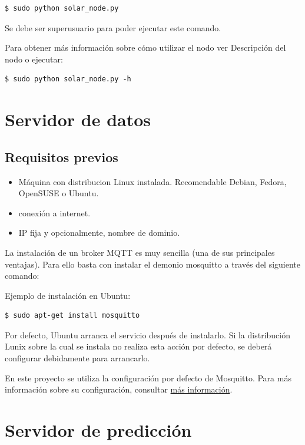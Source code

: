 \lstset{language=bash}
\begin{lstlisting}[frame=single]
$ sudo python solar_node.py
\end{lstlisting}

Se debe ser superusuario para poder ejecutar este comando.

Para obtener más información sobre cómo utilizar el nodo ver Descripción del nodo o ejecutar:

\lstset{language=bash}
\begin{lstlisting}[frame=single]
$ sudo python solar_node.py -h
\end{lstlisting}

\section{Servidor de datos}
\label{makereference7.2}
\subsection{Requisitos previos}
\label{makereference7.3}
\begin{itemize}
\item Máquina con distribucion Linux instalada. Recomendable Debian, Fedora, OpenSUSE o Ubuntu.
\item conexión a internet.
\item IP fija y opcionalmente, nombre de dominio.
\end{itemize}

La instalación de un broker MQTT es muy sencilla (una de sus principales ventajas). Para ello basta con instalar el demonio mosquitto a través del siguiente comando:

Ejemplo de instalación en Ubuntu:
\lstset{language=bash}
\begin{lstlisting}[frame=single]
$ sudo apt-get install mosquitto
\end{lstlisting}

Por defecto, Ubuntu arranca el servicio después de instalarlo. Si la distribución Lunix sobre la cual se instala no realiza esta acción por defecto, se deberá configurar debidamente para arrancarlo.

En este proyecto se utiliza la configuración por defecto de Mosquitto. Para más información sobre su configuración, consultar \href{https://www.digitalocean.com/community/tutorials/how-to-install-and-secure-the-mosquitto-mqtt-messaging-broker-on-ubuntu-16-04}{más información}.

\section{Servidor de predicción}
\label{makereference7.3}

